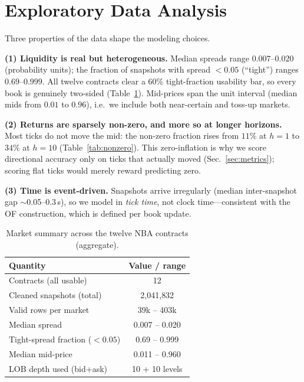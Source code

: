 \documentclass[10pt,twocolumn]{article}
\begin{document}
\section{Exploratory Data Analysis}

Three properties of the data shape the modeling choices.

\textbf{(1) Liquidity is real but heterogeneous.} Median spreads range
$0.007$--$0.020$ (probability units); the fraction of snapshots with spread
$<0.05$ (``tight'') ranges $0.69$--$0.999$. All twelve contracts clear a 60\%
tight-fraction usability bar, so every book is genuinely two-sided
(Table~\ref{tab:data}). Mid-prices span the unit interval (median mids from
$0.01$ to $0.96$), i.e.\ we include both near-certain and toss-up markets.

\textbf{(2) Returns are sparsely non-zero, and more so at longer horizons.} Most
ticks do not move the mid: the non-zero fraction rises from $11\%$ at $h{=}1$ to
$34\%$ at $h{=}10$ (Table~\ref{tab:nonzero}). This zero-inflation is why we score
directional accuracy only on ticks that actually moved (Sec.~\ref{sec:metrics});
scoring flat ticks would merely reward predicting zero.

\textbf{(3) Time is event-driven.} Snapshots arrive irregularly (median
inter-snapshot gap $\sim$0.05--0.3\,s), so we model in \emph{tick time}, not
clock time---consistent with the OF construction, which is defined per book
update.

\begin{table}[t]
\centering\small
\caption{Market summary across the twelve NBA contracts (aggregate).}
\label{tab:data}
\begin{tabular}{lc}
\toprule
Quantity & Value / range \\
\midrule
Contracts (all usable)            & 12 \\
Cleaned snapshots (total)         & 2{,}041{,}832 \\
Valid rows per market             & 39k -- 403k \\
Median spread                     & 0.007 -- 0.020 \\
Tight-spread fraction ($<0.05$)   & 0.69 -- 0.999 \\
Median mid-price                  & 0.011 -- 0.960 \\
LOB depth used (bid+ask)          & 10 + 10 levels \\
\bottomrule
\end{tabular}
\end{table}
\end{document}
